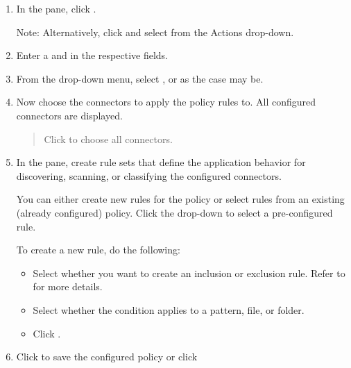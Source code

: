 \documentclass[letterpaper,10pt,english]{sphinxmanual}
\begin{document}
\label{\detokenize{loom_getting_started_guide:to-create-a-new-policy}}\begin{enumerate}
\item {} 
In the  pane, click .

Note: Alternatively, click  and select  from the Actions drop-down.

\item {} 
Enter a  and  in the respective fields.

\item {} 
From the  drop-down menu, select , or  as the case may be.

\item {} 
Now choose the connectors to apply the policy rules to.  All configured connectors are displayed.
\begin{quote}

Click  to choose all connectors.
\end{quote}

\item {} 
In the  pane, create rule sets that define the application behavior for discovering, scanning, or classifying the configured connectors.

You can either create new rules for the policy or select rules from an existing (already configured) policy. Click the  drop-down to select a pre-configured rule.

To create a new rule, do the following:
\begin{itemize}
\item {} 
Select whether you want to create an inclusion or exclusion rule. Refer to  for more details.

\item {} 
Select whether the condition applies to a pattern, file, or folder.

\item {} 
Click .

\end{itemize}

\item {} 
Click  to save the configured policy or click 

\end{enumerate}
\end{document}
